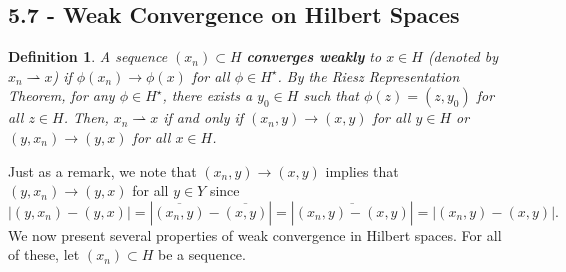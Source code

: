\documentclass[12pt]{article}
\newtheorem{definition}{Definition}
\newcommand{\ov}{\overline}
\newcommand{\sbs}{\subset}
\newcommand{\Hs}{H^{\star}}
\newcommand{\weak}{\rightharpoonup}
\begin{document}
\subsection*{5.7 - Weak Convergence on Hilbert Spaces}
\begin{definition}
A sequence $(x_n) \sbs H$ \textbf{converges weakly} to $x \in H$ (denoted by $x_n \weak x$) if $\phi(x_n) \to \phi(x)$ for all $\phi \in \Hs$. By the Riesz Representation Theorem, for any $\phi \in \Hs$, there exists a $y_0 \in H$ such that $\phi(z) = (z, y_0)$ for all $z \in H$. Then, $x_n \weak x$ if and only if $(x_n, y) \to (x, y)$ for all $y\in H$ or $(y, x_n) \to (y, x)$ for all $x \in H$. 
\end{definition}
\vspace{-20pt}
Just as a remark, we note that $(x_n, y) \to (x, y)$ implies that $(y, x_n) \to (y, x)$ for all $y \in Y$ since 
\[ | (y, x_n) - (y, x)| = \left| \ov{(x_n, y)} - \ov{(x, y)} \right| = \left| \ov{(x_n, y) - (x, y)} \right| = |(x_n, y) - (x,y)|. \]
We now present several properties of weak convergence in Hilbert spaces. For all of these, let $(x_n) \sbs H$ be a sequence. 
\end{document}
